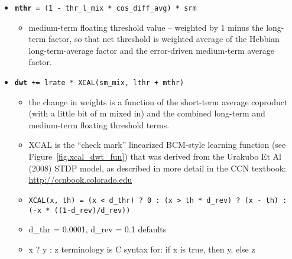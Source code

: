 \begin{itemize}
\begin{itemize}
\begin{itemize}
    \end{itemize}
  \item {\tt {\bf mthr} = (1 - thr\_l\_mix * cos\_diff\_avg) * srm}
    \begin{itemize}
    \item medium-term floating threshold value -- weighted by 1 minus the long-term factor, so that net threshold is weighted average of the Hebbian long-term-average factor and the error-driven medium-term average factor.
    \end{itemize}
  \item {\tt {\bf dwt} += lrate * XCAL(sm\_mix, lthr + mthr) }
    \begin{itemize}
    \item the change in weights is a function of the short-term average coproduct (with a little bit of m mixed in) and the combined long-term and medium-term floating threshold terms.
    \item XCAL is the ``check mark'' linearized BCM-style learning function (see Figure~\ref{fig.xcal_dwt_fun}) that was derived from the Urakubo Et Al (2008) STDP model, as described in more detail in the CCN textbook: \url{http://ccnbook.colorado.edu}
    \item{\tt  XCAL(x, th) = (x < d\_thr) ? 0 : (x > th * d\_rev) ? (x - th) : (-x * ((1-d\_rev)/d\_rev))}
    \item d\_thr = 0.0001, d\_rev = 0.1 defaults
    \item x ? y : z terminology is C syntax for: if x is true, then y, else z
    \end{itemize}
  \end{itemize}


\end{itemize}
